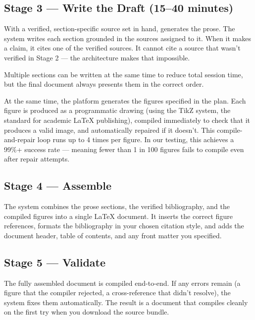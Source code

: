 \subsection{Stage 3 — Write the Draft (15–40 minutes)}

With a verified, section-specific source set in hand, \sys{} generates the prose.
The system writes each section grounded in the sources assigned to it.
When it makes a claim, it cites one of the verified sources.
It cannot cite a source that wasn't verified in Stage 2 — the architecture makes
that impossible.

Multiple sections can be written at the same time to reduce total session time,
but the final document always presents them in the correct order.

At the same time, the platform generates the figures specified in the plan.
Each figure is produced as a programmatic drawing (using the TikZ system, the
standard for academic \LaTeX{} publishing), compiled immediately to check that
it produces a valid image, and automatically repaired if it doesn't.
This compile-and-repair loop runs up to 4 times per figure.
In our testing, this achieves a 99\%+ success rate — meaning fewer than 1 in 100
figures fails to compile even after repair attempts.

\subsection{Stage 4 — Assemble}

The system combines the prose sections, the verified bibliography, and the
compiled figures into a single \LaTeX{} document.
It inserts the correct figure references, formats the bibliography in your chosen
citation style, and adds the document header, table of contents, and any
front matter you specified.

\subsection{Stage 5 — Validate}

The fully assembled document is compiled end-to-end.
If any errors remain (a figure that the compiler rejected, a cross-reference that
didn't resolve), the system fixes them automatically.
The result is a document that compiles cleanly on the first try when you
download the source bundle.


